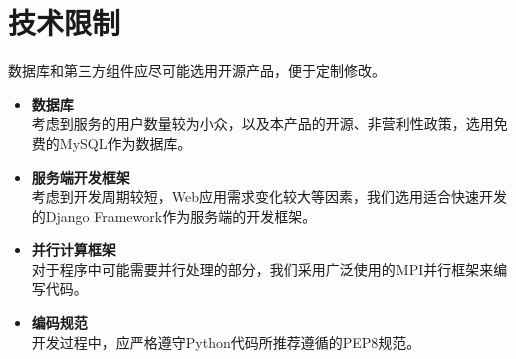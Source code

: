 \section{技术限制}


数据库和第三方组件应尽可能选用开源产品，便于定制修改。

\begin{itemize}
    \item \textbf{数据库}\\
    考虑到服务的用户数量较为小众，以及本产品的开源、非营利性政策，选用免费的MySQL作为数据库。
    \item \textbf{服务端开发框架}\\
    考虑到开发周期较短，Web应用需求变化较大等因素，我们选用适合快速开发的Django Framework作为服务端的开发框架。
    \item \textbf{并行计算框架}\\
    对于程序中可能需要并行处理的部分，我们采用广泛使用的MPI并行框架来编写代码。
    \item \textbf{编码规范}\\
    开发过程中，应严格遵守Python代码所推荐遵循的PEP8规范。

\end{itemize}